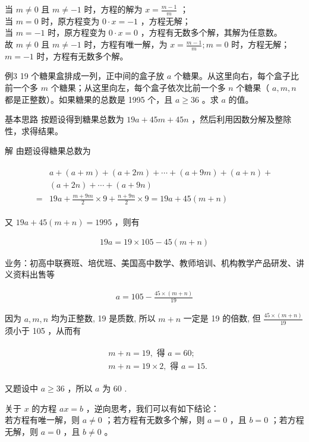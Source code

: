 \documentclass[10pt]{article}
\begin{document}
当 $m \neq 0$ 且 $m \neq-1$ 时，方程的解为 $x=\frac{m-1}{m}$ ；\\
当 $m=0$ 时，原方程变为 $0 \cdot x=-1$ ，方程无解；\\
当 $m=-1$ 时，原方程变为 $0 \cdot x=0$ ，方程有无数多个解，其解为任意数。\\
故 $m \neq 0$ 且 $m \neq-1$ 时，方程有唯一解，为 $x=\frac{m-1}{m} ; m=0$ 时，方程无解； $m=-1$ 时，方程有无数多个解。

例3 19 个糖果盒排成一列，正中间的盒子放 $a$ 个糖果。从这里向右，每个盒子比前一个多 $m$ 个糖果；从这里向左，每个盒子依次比前一个多 $n$ 个糖果（ $a, m, n$ 都是正整数）。如果糖果的总数是 1995 个，且 $a \geqslant 36$ 。求 $a$ 的值。

基本思路 按题设得到糖果总数为 $19 a+45 m+45 n$ ，然后利用因数分解及整除性，求得结果。

解 由题设得糖果总数为

\begin{align*}
\begin{aligned}
& a+(a+m)+(a+2 m)+\cdots+(a+9 m)+(a+n)+ \\
& (a+2 n)+\cdots+(a+9 n) \\
= & 19 a+\frac{m+9 m}{2} \times 9+\frac{n+9 n}{2} \times 9=19 a+45(m+n)
\end{aligned}
\end{align*}

又 $19 a+45(m+n)=1995$ ，则有

\begin{align*}
19 a=19 \times 105-45(m+n)
\end{align*}

业务：初高中联赛班、培优班、美国高中数学、教师培训、机构教学产品研发、讲义资料出售等

\begin{align*}
a=105-\frac{45 \times(m+n)}{19}
\end{align*}

因为 $a, m, n$ 均为正整数, 19 是质数, 所以 $m+n$ 一定是 19 的倍数, 但 $\frac{45 \times(m+n)}{19}$ 须小于 105 ，从而有

\begin{align*}
\begin{aligned}
& m+n=19, \text { 得 } a=60 ; \\
& m+n=19 \times 2, \text { 得 } a=15 .
\end{aligned}
\end{align*}

又题设中 $a \geqslant 36$ ，所以 $a$ 为 60 .

关于 $x$ 的方程 $a x=b$ ，逆向思考，我们可以有如下结论：\\
若方程有唯一解，则 $a \neq 0$ ；若方程有无数多个解，则 $a=0$ ，且 $b=0$ ；若方程无解，则 $a=0$ ，且 $b \neq 0$ 。
\end{document}
